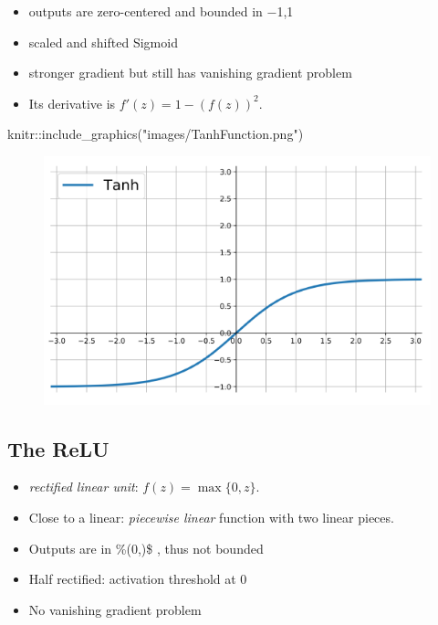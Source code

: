 \documentclass[
  letterpaper,
  DIV=11,
  numbers=noendperiod]{scrartcl}
\newenvironment{Shaded}{\begin{snugshade}}{\end{snugshade}}
\newcommand{\FunctionTok}[1]{\textcolor[rgb]{0.28,0.35,0.67}{#1}}
\newcommand{\NormalTok}[1]{\textcolor[rgb]{0.00,0.23,0.31}{#1}}
\newcommand{\SpecialCharTok}[1]{\textcolor[rgb]{0.37,0.37,0.37}{#1}}
\newcommand{\StringTok}[1]{\textcolor[rgb]{0.13,0.47,0.30}{#1}}
\begin{document}
\begin{itemize}
\item
  outputs are zero-centered and bounded in −1,1
\item
  scaled and shifted Sigmoid
\item
  stronger gradient but still has vanishing gradient problem
\item
  Its derivative is \(f'(z)=1-(f(z))^2\).
\end{itemize}

\begin{Shaded}
\begin{Highlighting}[]
\NormalTok{knitr}\SpecialCharTok{::}\FunctionTok{include\_graphics}\NormalTok{(}\StringTok{"images/TanhFunction.png"}\NormalTok{)}
\end{Highlighting}
\end{Shaded}

\begin{figure}[H]

{\centering \includegraphics[width=1\textwidth,height=\textheight]{images/TanhFunction.png}

}

\end{figure}

\hypertarget{the-relu}{%
\subsection{The ReLU}\label{the-relu}}

\begin{itemize}
\item
  \emph{rectified linear unit}: \(f(z)=\max\{0,z\}\).
\item
  Close to a linear: \emph{piecewise linear} function with two linear
  pieces.
\item
  Outputs are in \%(0,\infty)\$ , thus not bounded
\item
  Half rectified: activation threshold at 0
\item
  No vanishing gradient problem
\end{itemize}
\end{document}
